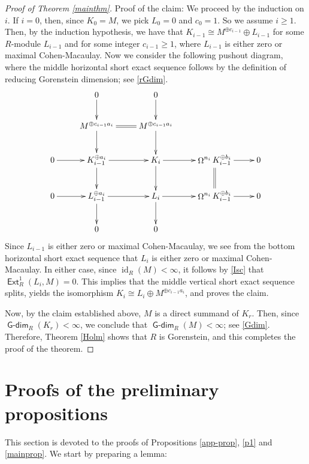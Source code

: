 \documentclass{amsart}
\theoremstyle{plain} %
\theoremstyle{definition}
\DeclareMathOperator{\id}{id}
\def\Ext{\operatorname{\mathsf{Ext}}}
\DeclareMathOperator{\Gdim}{\mathsf{G-dim}}
\DeclareMathOperator{\syz}{\Omega}
\begin{document}
\begin{proof}[Proof of Theorem \ref{mainthm}]
Proof of the claim: We proceed by the induction on $i$. If $i=0$, then, since $K_0=M$, we pick $L_0=0$ and $c_0=1$. So we assume $i\geq 1$. Then, by the  induction hypothesis, we have that $K_{i-1}  \cong M^{\oplus c_{i-1}} \oplus L_{i-1}$ for some $R$-module $L_{i-1}$ and for some integer $c_{i-1}\geq 1$, where $L_{i-1}$ is either zero or maximal Cohen-Macaulay. Now we consider the following pushout diagram, where the middle horizontal short exact sequence follows by the definition of reducing Gorenstein dimension; see \ref{rGdim}.  
\[
\xymatrix{
& 0 \ar[d] & 0 \ar[d] & & \\
& M^{\oplus c_{i-1}a_i} \ar[d] \ar@{=}[r] & M^{\oplus c_{i-1}a_i} \ar[d]  & & \\
0 \ar[r] & K_{i-1}^{\oplus a_i} \ar[d] \ar[r] & K_i \ar[d] \ar[r] & \syz^{n_i}K_{i-1}^{\oplus b_i } \ar@{=}[d] \ar[r] & 0 \\
0 \ar[r] & L_{i-1}^{\oplus a_i} \ar[d] \ar[r] & L_i \ar[d] \ar[r] & \syz^{n_i} K_{i-1}^{\oplus b_i } \ar[r] & 0 \\
& 0 & 0 & &}
\]
Since $L_{i-1}$ is either zero or maximal Cohen-Macaulay, we see from the bottom horizontal short exact sequence that $L_i$ is either zero or maximal Cohen-Macaulay.
In either case, since $\id_R(M)<\infty$, it follows by \ref{Isc} that $\Ext^1_R(L_i, M)=0$. This implies that the middle vertical short exact sequence splits, yields the isomorphism $K_i \cong L_i \oplus M^{\oplus c_{i-1}a_i}$, and proves the claim.

Now, by the claim established above, $M$ is a direct summand of $K_r$. Then, since $\Gdim_R(K_r)<\infty$, we conclude that $\Gdim_R(M)<\infty$; see \ref{Gdim}. Therefore, Theorem \ref{Holm} shows that $R$ is Gorenstein, and this completes the proof of the theorem.
\end{proof}


\section{Proofs of the preliminary propositions}

This section is devoted to the proofs of Propositions \ref{app-prop}, \ref{p1} and \ref{mainprop}. We start by preparing a lemma:

\end{document}
